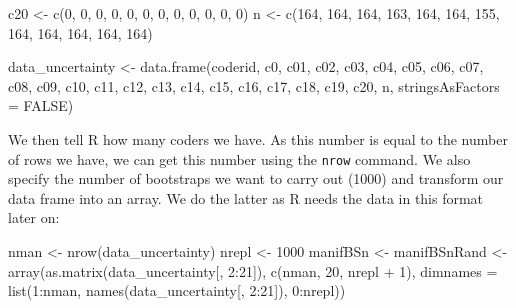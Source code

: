 \documentclass[
]{book}
\newenvironment{Shaded}{\begin{snugshade}}{\end{snugshade}}
\newcommand{\AttributeTok}[1]{\textcolor[rgb]{0.77,0.63,0.00}{#1}}
\newcommand{\ConstantTok}[1]{\textcolor[rgb]{0.00,0.00,0.00}{#1}}
\newcommand{\DecValTok}[1]{\textcolor[rgb]{0.00,0.00,0.81}{#1}}
\newcommand{\FunctionTok}[1]{\textcolor[rgb]{0.00,0.00,0.00}{#1}}
\newcommand{\NormalTok}[1]{#1}
\newcommand{\OtherTok}[1]{\textcolor[rgb]{0.56,0.35,0.01}{#1}}
\newcommand{\SpecialCharTok}[1]{\textcolor[rgb]{0.00,0.00,0.00}{#1}}
\begin{document}
\begin{Shaded}
\begin{Highlighting}[]
\NormalTok{c20 }\OtherTok{\textless{}{-}} \FunctionTok{c}\NormalTok{(}\DecValTok{0}\NormalTok{, }\DecValTok{0}\NormalTok{, }\DecValTok{0}\NormalTok{, }\DecValTok{0}\NormalTok{, }\DecValTok{0}\NormalTok{, }\DecValTok{0}\NormalTok{, }\DecValTok{0}\NormalTok{, }\DecValTok{0}\NormalTok{, }\DecValTok{0}\NormalTok{, }\DecValTok{0}\NormalTok{, }\DecValTok{0}\NormalTok{, }\DecValTok{0}\NormalTok{)}
\NormalTok{n }\OtherTok{\textless{}{-}} \FunctionTok{c}\NormalTok{(}\DecValTok{164}\NormalTok{, }\DecValTok{164}\NormalTok{, }\DecValTok{164}\NormalTok{, }\DecValTok{163}\NormalTok{, }\DecValTok{164}\NormalTok{, }\DecValTok{164}\NormalTok{, }\DecValTok{155}\NormalTok{, }\DecValTok{164}\NormalTok{, }\DecValTok{164}\NormalTok{, }\DecValTok{164}\NormalTok{, }\DecValTok{164}\NormalTok{,}
    \DecValTok{164}\NormalTok{)}

\NormalTok{data\_uncertainty }\OtherTok{\textless{}{-}} \FunctionTok{data.frame}\NormalTok{(coderid, c0, c01, c02, c03, c04,}
\NormalTok{    c05, c06, c07, c08, c09, c10, c11, c12, c13, c14, c15, c16,}
\NormalTok{    c17, c18, c19, c20, n, }\AttributeTok{stringsAsFactors =} \ConstantTok{FALSE}\NormalTok{)}
\end{Highlighting}
\end{Shaded}

We then tell R how many coders we have. As this number is equal to the number of rows we have, we can get this number using the \texttt{nrow} command. We also specify the number of bootstraps we want to carry out (1000) and transform our data frame into an array. We do the latter as R needs the data in this format later on:

\begin{Shaded}
\begin{Highlighting}[]
\NormalTok{nman }\OtherTok{\textless{}{-}} \FunctionTok{nrow}\NormalTok{(data\_uncertainty)}
\NormalTok{nrepl }\OtherTok{\textless{}{-}} \DecValTok{1000}
\NormalTok{manifBSn }\OtherTok{\textless{}{-}}\NormalTok{ manifBSnRand }\OtherTok{\textless{}{-}} \FunctionTok{array}\NormalTok{(}\FunctionTok{as.matrix}\NormalTok{(data\_uncertainty[,}
    \DecValTok{2}\SpecialCharTok{:}\DecValTok{21}\NormalTok{]), }\FunctionTok{c}\NormalTok{(nman, }\DecValTok{20}\NormalTok{, nrepl }\SpecialCharTok{+} \DecValTok{1}\NormalTok{), }\AttributeTok{dimnames =} \FunctionTok{list}\NormalTok{(}\DecValTok{1}\SpecialCharTok{:}\NormalTok{nman, }\FunctionTok{names}\NormalTok{(data\_uncertainty[,}
    \DecValTok{2}\SpecialCharTok{:}\DecValTok{21}\NormalTok{]), }\DecValTok{0}\SpecialCharTok{:}\NormalTok{nrepl))}
\end{Highlighting}
\end{Shaded}
\end{document}
